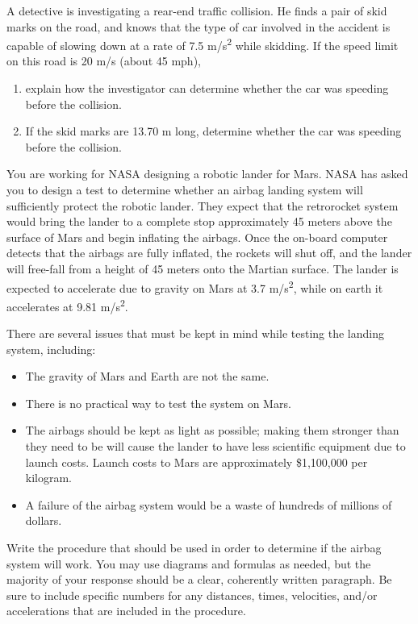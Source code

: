 \documentclass[11pt]{examdesign}
\begin{document}
\begin{shortanswer}[title={Free Response},
	rearrange=no]




\begin{question}
A detective is investigating a rear-end traffic collision.  He finds a pair of skid marks on the road, and knows that the type of car involved in the accident is capable of slowing down at a rate of 7.5 m/s\textsuperscript{2} while skidding.  If the speed limit on this road is 20 m/s (about 45 mph),
	\begin{enumerate}
		\item explain how the investigator can determine whether the car was speeding before the collision.
		\vspace{1 in}
		\item If the skid marks are 13.70 m long, determine whether the car was speeding before the collision.
		\vspace{2 in}
	\end{enumerate}
	\end{question}

\begin{question}
	You are working for NASA designing a robotic lander for Mars.  NASA has asked you to design a test to determine whether an airbag landing system will sufficiently protect the robotic lander.  They expect that the retrorocket system would bring the lander to a complete stop approximately 45 meters above the surface of Mars and begin inflating the airbags.  Once the on-board computer detects that the airbags are fully inflated, the rockets will shut off, and the lander will free-fall from a height of 45 meters onto the Martian surface.  The lander is expected to accelerate due to gravity on Mars at 3.7 m/s\textsuperscript{2}, while on earth it accelerates at 9.81 m/s\textsuperscript{2}.
	
	There are several issues that must be kept in mind while testing the landing system, including:
	\begin{itemize}
		\item The gravity of Mars and Earth are not the same.
		\item There is no practical way to test the system on Mars.
		\item The airbags should be kept as light as possible; making them stronger than they need to be will cause the lander to have less scientific equipment due to launch costs.  Launch costs to Mars are approximately \$1,100,000 per kilogram.
		\item A failure of the airbag system would be a waste of hundreds of millions of dollars.
	\end{itemize}
	Write the procedure that should be used in order to determine if the airbag system will work.  You may use diagrams and formulas as needed, but the majority of your response should be a clear, coherently written paragraph.  Be sure to include specific numbers for any distances, times, velocities, and/or accelerations that are included in the procedure.
	
	
	
\end{question}

	\end{shortanswer}
\end{document}
